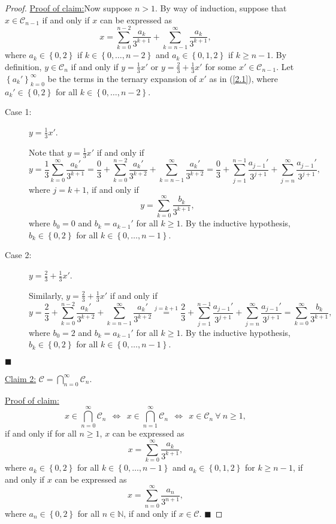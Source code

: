 \documentclass[12pt]{article}
\newenvironment{claimproof}[1]{\par\noindent\underline{Proof of claim:}\space#1}{\hfill $\blacksquare$\vspace{5mm}}
\begin{document}
\begin{proof}
\begin{claimproof}
Now suppose $n > 1$. By way of induction, suppose that $x \in \mathcal{C}_{n-1}$ if and only if $x$ can be expressed as 
\begin{equation}
x = \sum_{k=0}^{n-2}\frac{a_{k}}{3^{k+1}} + \sum_{k=n-1}^{\infty}\frac{a_{k}}{3^{k+1}},
\label{2.1}
\end{equation}
where $a_{k} \in \left\{ 0,2 \right\}$ if $k \in \left\{ 0,\hdots, n-2 \right\}$ and $a_{k} \in \left\{ 0,1,2 \right\}$ if $k \geq n-1$. By
definition, $y \in \mathcal{C}_{n}$ if and only if $y = \frac{1}{3}x'$ or $y = \frac{2}{3} + \frac{1}{3}x'$ for some $x' \in
\mathcal{C}_{n-1}$. Let $\left\{ a_{k}' \right\}_{k=0}^{\infty}$ be the terms in the ternary expansion of $x'$ as in (\ref{2.1}), where
$a_{k}' \in \left\{ 0,2 \right\}$ for all $k \in \left\{ 0, \hdots, n-2 \right\}$.
\begin{description}
\item[Case 1:] $y = \frac{1}{3}x'$.

Note that $y = \frac{1}{3}x'$ if and only if
\[ y = \frac{1}{3}\sum_{k=0}^{\infty}\frac{a_{k}'}{3^{k+1}} = \frac{0}{3} + \sum_{k=0}^{n-2}\frac{a_{k}'}{3^{k+2}} +
\sum_{k=n-1}^{\infty}\frac{a_{k}'}{3^{k+2}} = \frac{0}{3} + \sum_{j=1}^{n-1}\frac{a_{j-1}'}{3^{j+1}} + \sum_{j=n}^{\infty}\frac{a_{j-1}'}{3^{j+1}}, \]
where $j = k + 1$, if and only if 
\[ y = \sum_{k=0}^{\infty}\frac{b_{k}}{3^{k+1}}, \]
where $b_{0} = 0$ and $b_{k} = a_{k-1}'$ for all $k \geq 1$. By the inductive hypothesis, $b_{k} \in \left\{ 0,2\right\}$ for all $k \in \left\{ 0,
\hdots, n-1 \right\}$.

\item[Case 2:] $y = \frac{2}{3} + \frac{1}{3}x'$.

Similarly, $y = \frac{2}{3} + \frac{1}{3}x'$ if and only if 
\[ y = \frac{2}{3} + \sum_{k=0}^{n-2}\frac{a_{k}'}{3^{k+2}} + \sum_{k=n-1}^{\infty}\frac{a_{k}'}{3^{k+2}} \stackrel{j=k+1}{=} \frac{2}{3} +
\sum_{j=1}^{n-1}\frac{a_{j-1}'}{3^{j+1}} + \sum_{j=n}^{\infty}\frac{a_{j-1}'}{3^{j+1}} = \sum_{k=0}^{\infty}\frac{b_{k}}{3^{k+1}}, \]
where $b_{0} = 2$ and $b_{k} = a_{k-1}'$ for all $k \geq 1$. By the inductive hypothesis, $b_{k} \in \left\{ 0,2 \right\}$ for all $k \in \left\{
0,\hdots, n-1 \right\}$.
\end{description}
\end{claimproof}

\underline{Claim 2:} $\mathcal{C} = \bigcap_{n=0}^{\infty}\mathcal{C}_{n}$.

\begin{claimproof}
\[ x \in \bigcap_{n=0}^{\infty}\mathcal{C}_{n}\ \  \Leftrightarrow \ \ x \in \bigcap_{n=1}^{\infty}\mathcal{C}_{n}\ \  \Leftrightarrow \ \ x\in \mathcal{C}_{n}
\ \forall\ n \geq 1, \] 
if and only if for all $n \geq 1$, $x$ can be expressed as 
\[ x = \sum_{k=0}^{\infty}\frac{a_{k}}{3^{k+1}}, \]
where $a_{k} \in \left\{ 0,2 \right\}$ for all $k \in \left\{ 0,\hdots,n-1 \right\}$ and $a_{k} \in \left\{ 0,1,2 \right\}$ for $k \geq n-1$, if and
only if $x$ can be expressed as 
\[ x = \sum_{n=0}^{\infty}\frac{a_{n}}{3^{n+1}}, \]
where $a_{n} \in \left\{ 0,2 \right\}$ for all $n \in \mathbb{N}$, if and only if $x \in \mathcal{C}$.
\end{claimproof}


\end{proof}
\end{document}
